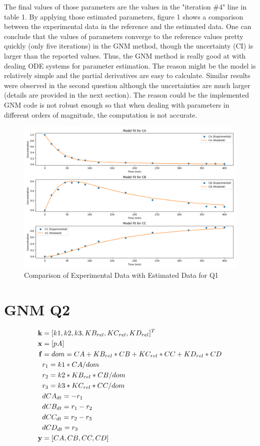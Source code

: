 \documentclass[a4paper,12pt]{article} %
\begin{document}
The final values of those parameters are the values in the "iteration \#4" line in table 1. By applying those estimated parameters, figure 1 shows
a comparison between the experimental data in the reference and the estimated data. One can conclude that the values of parameters converge to the reference values
pretty quickly (only five iterations) in the GNM method, though the uncertainty (CI) is larger than the reported values. Thus, the GNM method is really good at with dealing ODE systems 
for parameter estimation. The reason might be the model is relatively simple and the partial derivatives are easy to calculate. Similar results were observed in the second question although the
uncertainties are much larger (details are provided in the next section). The reason could be the implemented GNM code is not robust enough so that when dealing with parameters in different orders of magnitude, the computation is not accurate. 
\begin{figure}[ht]
    \centering
    \includegraphics[width=1\textwidth]{Q1_GNM_comp.png}
    \caption{Comparison of Experimental Data with Estimated Data for Q1}
\end{figure}

\clearpage
\section*{GNM Q2}
\begin{align*}
    \mathbf{k} &= [k1 ,k2, k3, KB_{rel}, KC_{rel}, KD_{rel}]^T \\
    \mathbf{x} &= [pA]\\
    \mathbf{f} &= dom = CA + KB_{rel}*CB + KC_{rel}*CC + KD_{rel}*CD\\
    &r_1 = k1*CA/dom\\
    &r_2 = k2*KB_{rel}*CB/dom\\
    &r_3 = k3*KC_{rel}*CC/dom\\
    &dCA_{dt} = -r_1 \\
    &dCB_{dt} = r_1-r_2\\
    &dCC_{dt} = r_2-r_3\\
    &dCD_{dt} = r_3\\
    \mathbf{y} &= [CA, CB, CC, CD]\\
\end{align*} 
\end{document}

